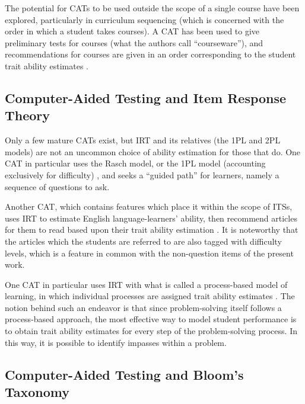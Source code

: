 The potential for CATs to be used outside the scope of a single course have
been explored, particularly in curriculum sequencing (which is concerned with
the order in which a student takes courses).  A CAT has been used to give
preliminary tests for courses (what the authors call ``courseware''), and
recommendations for courses are given in an order corresponding to the student
trait ability estimates \cite{chen2006personalized}.



\subsection{Computer-Aided Testing and Item Response Theory}

Only a few mature CATs exist, but IRT and its relatives (the 1PL and 2PL
models) are not an uncommon choice of ability estimation for those that do.
One CAT in particular uses the Rasch model, or the 1PL model (accounting
exclusively for difficulty) \cite{chen2005personalized}, and seeks a ``guided
path'' for learners, namely a sequence of questions to ask.

Another CAT, which contains features which place it within the scope of ITSs,
uses IRT to estimate English language-learners' ability, then recommend
articles for them to read based upon their trait ability estimation
\cite{yarandi2011personalised}.  It is noteworthy that the articles which the
students are referred to are also tagged with difficulty levels,  which is a
feature in common with the non-question items of the present work.

One CAT in particular uses IRT with what is called a process-based model of
learning, in which individual processes are assigned trait ability estimates
\cite{tatsuoka1990toward}.  The notion behind such an endeavor is that since
problem-solving itself follows a process-based approach, the most effective way
to model student performance is to obtain trait ability estimates for every
step of the problem-solving process.  In this way, it is possible to identify
impasses within a problem.  

\subsection{Computer-Aided Testing and Bloom's Taxonomy}


